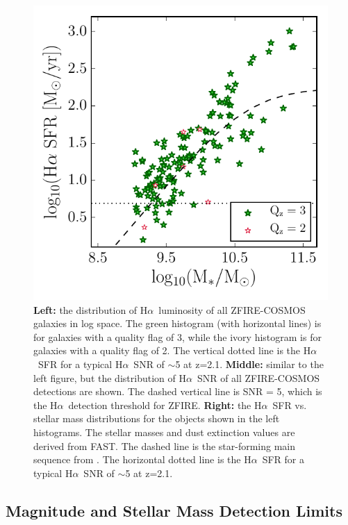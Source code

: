 \documentclass[iop]{emulateapj}
\newcommand{\Halpha}{H$\alpha$}
\newcommand{\around}{$\sim$}
\begin{document}
\begin{figure}
\includegraphics[trim = 10 0 5 5, clip, scale=0.6]{figures/lmass_vs_HaSFR.pdf}
\caption{ {\bf Left:} the distribution of \Halpha\ luminosity of all ZFIRE-COSMOS galaxies in log space. The green histogram (with horizontal lines) is for galaxies with a quality flag of 3, while the ivory histogram is for galaxies with a quality flag of 2.
The vertical dotted line is the \Halpha\ SFR for a typical \Halpha\ SNR of \around 5 at z=2.1. 
{\bf Middle:} similar to the left figure, but the distribution of \Halpha\ SNR of all ZFIRE-COSMOS detections are shown. The dashed vertical line is SNR = 5, which is the \Halpha\ detection threshold for ZFIRE. 
{\bf Right:} the \Halpha\ SFR vs. stellar mass distributions for the objects shown in the left histograms. The stellar masses and dust extinction values are derived from FAST. The  dashed line is the star-forming main sequence from \citet{Tomczak2014}. The horizontal dotted line is the \Halpha\ SFR for a typical \Halpha\ SNR of \around 5 at z=2.1.
}
\label{fig:Halpha}
\end{figure}




\subsection{Magnitude and Stellar Mass Detection Limits}
\end{document}
